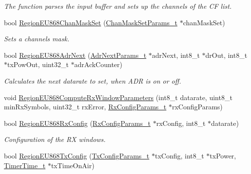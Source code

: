 \begin{DoxyCompactItemize}
\begin{DoxyCompactList}\small\item\em The function parses the input buffer and sets up the channels of the CF list. \end{DoxyCompactList}\item 
bool \mbox{\hyperlink{group___r_e_g_i_o_n_e_u868_ga8c63acfe556cf427ba83e5429f2ec1d9}{Region\+E\+U868\+Chan\+Mask\+Set}} (\mbox{\hyperlink{group___r_e_g_i_o_n_ga6d24f7da136006410827dfb29f6b9b9e}{Chan\+Mask\+Set\+Params\+\_\+t}} $\ast$chan\+Mask\+Set)
\begin{DoxyCompactList}\small\item\em Sets a channels mask. \end{DoxyCompactList}\item 
bool \mbox{\hyperlink{group___r_e_g_i_o_n_e_u868_gaa93c92348ce901ace20e766be0be1941}{Region\+E\+U868\+Adr\+Next}} (\mbox{\hyperlink{group___r_e_g_i_o_n_ga567c2742622326b350b4e91bbf61b4ce}{Adr\+Next\+Params\+\_\+t}} $\ast$adr\+Next, int8\+\_\+t $\ast$dr\+Out, int8\+\_\+t $\ast$tx\+Pow\+Out, uint32\+\_\+t $\ast$adr\+Ack\+Counter)
\begin{DoxyCompactList}\small\item\em Calculates the next datarate to set, when A\+DR is on or off. \end{DoxyCompactList}\item 
void \mbox{\hyperlink{group___r_e_g_i_o_n_e_u868_ga7650d2866d0b5df186afd4c0dd1f52bb}{Region\+E\+U868\+Compute\+Rx\+Window\+Parameters}} (int8\+\_\+t datarate, uint8\+\_\+t min\+Rx\+Symbols, uint32\+\_\+t rx\+Error, \mbox{\hyperlink{group___r_e_g_i_o_n_ga375c038078dfcfc7ef14280021db719e}{Rx\+Config\+Params\+\_\+t}} $\ast$rx\+Config\+Params)
\item 
bool \mbox{\hyperlink{group___r_e_g_i_o_n_e_u868_gae57b8f1a0b5e45ab2371fbc0737322a7}{Region\+E\+U868\+Rx\+Config}} (\mbox{\hyperlink{group___r_e_g_i_o_n_ga375c038078dfcfc7ef14280021db719e}{Rx\+Config\+Params\+\_\+t}} $\ast$rx\+Config, int8\+\_\+t $\ast$datarate)
\begin{DoxyCompactList}\small\item\em Configuration of the RX windows. \end{DoxyCompactList}\item 
bool \mbox{\hyperlink{group___r_e_g_i_o_n_e_u868_ga7cab7daedc2b01b688d4e2cfb0a30029}{Region\+E\+U868\+Tx\+Config}} (\mbox{\hyperlink{group___r_e_g_i_o_n_gabed730d4d04b0b60d4b6d1966d3f21d3}{Tx\+Config\+Params\+\_\+t}} $\ast$tx\+Config, int8\+\_\+t $\ast$tx\+Power, \mbox{\hyperlink{utilities_8h_a4215ca43d3e953099ea758ce428599d0}{Timer\+Time\+\_\+t}} $\ast$tx\+Time\+On\+Air)

\end{DoxyCompactItemize}
